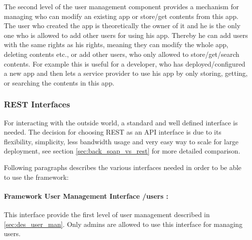 The second level of the user management component provides a mechanism for managing who can modify an existing app or store/get contents from this app. The user who created the app is theoretically the owner of it and he is the only one who is allowed to add other users for using his app. Thereby he can add users with the same rights as his rights, meaning they can modify the whole app, deleting contents etc., or add other users, who only allowed to store/get/search contents. For example this is useful for a developer, who has deployed/configured a new app and then lets a service provider to use his app by only storing, getting,  or searching the contents in this app. 

\subsubsection{REST Interfaces \label{sec:des_rest_api}} For interacting with the outside world, a standard and well defined interface is needed. The decision for choosing \ac{REST} as an \ac{API} interface is due to its flexibility, simplicity, less bandwidth usage and very easy way to scale for large deployment, see section \ref{sec:back_soap_vs_rest} for more detailed comparison.

Following paragraphs describes the various interfaces needed in order to be able to use the framework:

\paragraph{Framework User Management Interface /users :} This interface provide the first level of user management described in \ref{sec:des_user_man}. Only admins are allowed to use this interface for managing users.

